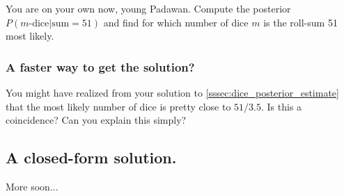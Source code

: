 \documentclass[11pt, oneside]{article}   	%
\begin{document}
You are on your own now, young Padawan. Compute the posterior $P(m \text{-dice}| \text{sum}=51)$ and find for which number of dice $m$ is the roll-sum 51 most likely. 

\subsubsection{A faster way to get the solution?}
You might have realized from your solution to \ref{sssec:dice_posterior_estimate} that the most likely number of dice is pretty close to $51/3.5$. Is this a coincidence? Can you explain this simply?

\subsection{A closed-form solution.}
More soon...
\end{document}
